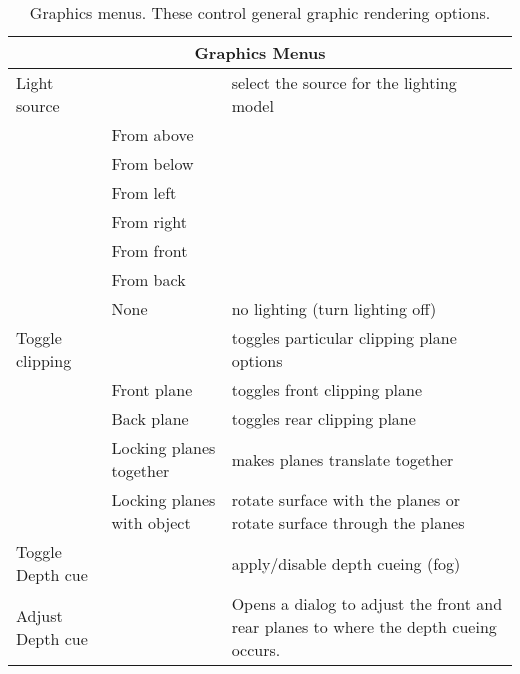 \begin{table}[ht]
  \begin{center}
    \begin{tabular}{|l|l|p{3 in}|} \hline
      \multicolumn{3}{|c|}{\textbf{Graphics Menus}} \\ \hline
    Light source & & select the source for the lighting model\\
    & From above &  \\
    & From below &  \\
    & From left &  \\
    & From right &  \\
    & From front &  \\
    & From back &  \\
    & None & no lighting (turn lighting off) \\ \hline
    Toggle clipping & & toggles particular clipping plane options \\
    & Front plane & toggles front clipping plane \\
    & Back plane & toggles rear clipping plane \\
    & Locking planes together & makes planes translate together\\
    & Locking planes with object & rotate surface with the planes or
        rotate surface through the planes \\
    Toggle Depth cue & & apply/disable depth cueing (fog) \\
    Adjust Depth cue & & Opens a dialog to adjust the front and rear planes
    to where the depth cueing occurs. \\
    \hline
    \end{tabular}
  \end{center}
\caption{Graphics menus.  These control general graphic rendering options.}
\end{table}

